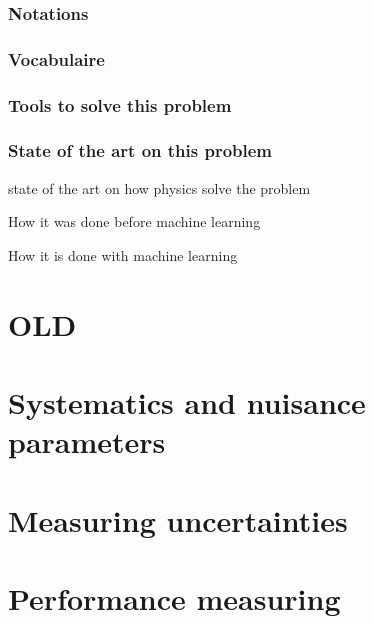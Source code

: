 \subsubsection{Notations} %
\label{sub:notations}

\subsubsection{Vocabulaire} %
\label{sub:vocabulaire}

\subsubsection{Tools to solve this problem} %
\label{sub:tools_to_solve_this_problem}


\subsubsection{State of the art on this problem} %
\label{sub:state_of_the_art_on_this_problem}


state of the art on how physics solve the problem



How it was done before machine learning


How it is done with machine learning



\section{OLD} %

\section{Systematics and nuisance parameters} %
\label{sec:systematics_and_nuisance_parameters}

\section{Measuring uncertainties} %
\label{sec:measuring_uncertainties}

\section{ Performance measuring }
\label{sec:performance_measuring}

